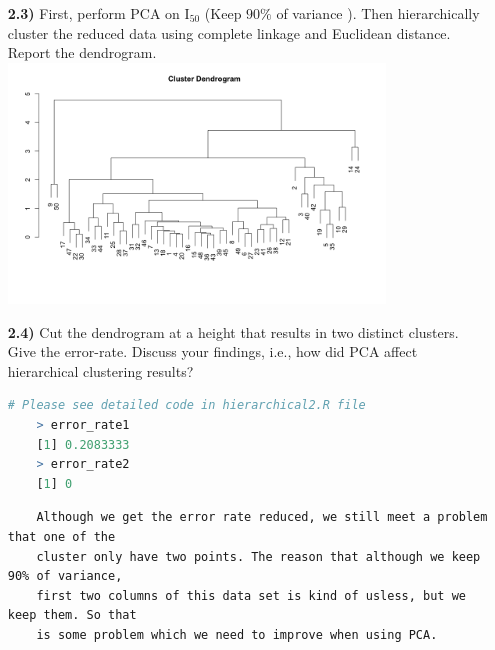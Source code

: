 \documentclass{article}
\begin{document}
\begin{enumerate}
  \item[\textbf{2.3)}] First, perform PCA on $\text{I}_{50}$ (Keep $90\%$ of variance ). Then hierarchically cluster the reduced data using complete linkage and Euclidean distance. Report the dendrogram.
\\  
  \includegraphics[width=10cm]{2-3.png}
  \pagebreak
    \item[\textbf{2.4)}]  Cut the dendrogram at a height that results in two distinct  clusters. Give the error-rate.  Discuss your findings, i.e., how  did PCA affect hierarchical clustering results?
    \begin{lstlisting}[language=R]
    # Please see detailed code in hierarchical2.R file
    > error_rate1
    [1] 0.2083333
    > error_rate2
    [1] 0
    \end{lstlisting}
    \begin{verbatim}
    Although we get the error rate reduced, we still meet a problem that one of the 
    cluster only have two points. The reason that although we keep 90% of variance, 
    first two columns of this data set is kind of usless, but we keep them. So that 
    is some problem which we need to improve when using PCA.
    \end{verbatim}
\end{enumerate}

\pagebreak
\end{document}
